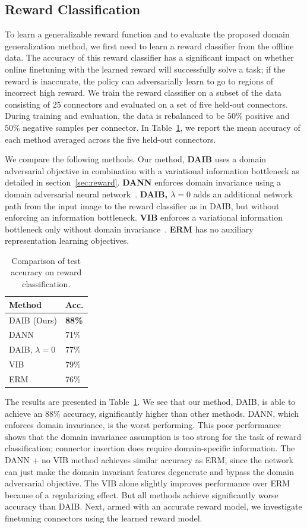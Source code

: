 \subsection{Reward Classification}

To learn a generalizable reward function and to evaluate the proposed domain generalization method, we first need to learn a reward classifier from the offline data. 
The accuracy of this reward classifier has a significant impact on whether online finetuning with the learned reward will successfully solve a task; if the reward is inaccurate, the policy can adversarially learn to go to regions of incorrect high reward.
We train the reward classifier on a subset of the data consisting of 25 connectors and evaluated on a set of five held-out connectors.
During training and evaluation, the data is rebalanced to be $50\%$ positive and $50\%$ negative samples per connector.
In Table~\ref{tab:reward}, we report the mean accuracy of each method averaged across the five held-out connectors.

We compare the following methods.
Our method, \textbf{DAIB} uses a domain adversarial objective in combination with a variational information bottleneck as detailed in section~\ref{sec:reward}. \textbf{DANN} enforces domain invariance using a domain adversarial neural network~\cite{ganin2016domainadversarial}. \textbf{DAIB, $\lambda=0$} adds an additional network path from the input image to the reward classifier as in DAIB, but without enforcing an information bottleneck. \textbf{VIB} enforces a variational information bottleneck only without domain invariance~\cite{alemi2017vib}. \textbf{ERM} has no auxiliary representation learning objectives.

\begin{table}
\begin{tabular}{l|l}
Method   & Acc. \\ \hline
DAIB (Ours) & \textbf{88\%}     \\
DANN          & 71\%     \\
DAIB, $\lambda=0$    & 77\%     \\
VIB         & 79\%     \\
ERM             & 76\%    
\end{tabular}
\caption{Comparison of test accuracy on reward classification.}
\label{tab:reward}
\end{table}
The results are presented in Table~\ref{tab:reward}. We see that our method, DAIB, is able to achieve an $88\%$ accuracy, significantly higher than other methods. DANN, which enforces domain invariance, is the worst performing. This poor performance shows that the domain invariance assumption is too strong for the task of reward classification; connector insertion does require domain-specific information. The DANN + no VIB
method achieves similar accuracy as ERM, since the network can just make the domain invariant features degenerate and bypass the domain adversarial objective.
The VIB alone slightly improves performance over ERM because of a regularizing effect. But all methods achieve significantly worse accuracy than DAIB. Next, armed with an accurate reward model, we investigate finetuning connectors using the learned reward model.

